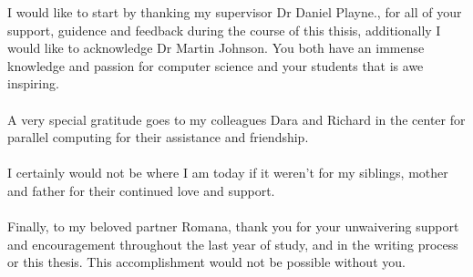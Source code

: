 
I would like to start by thanking my supervisor Dr Daniel Playne., for all of your support, guidence and feedback during the course of this thisis, additionally I would like to acknowledge Dr Martin Johnson. You both have an immense knowledge and passion for computer science and your students that is awe inspiring.\\
\\
\noindent
A very special gratitude goes to my colleagues Dara and Richard in the center for parallel computing for their assistance and friendship. \\
\\
\noindent
I certainly would not be where I am today if it weren't for my siblings, mother and father for their continued love and support.\\
\\
\noindent
Finally, to my beloved partner Romana, thank you for your unwaivering support and encouragement throughout the last year of study, and in the writing process or this thesis. This accomplishment would not be possible without you. 
